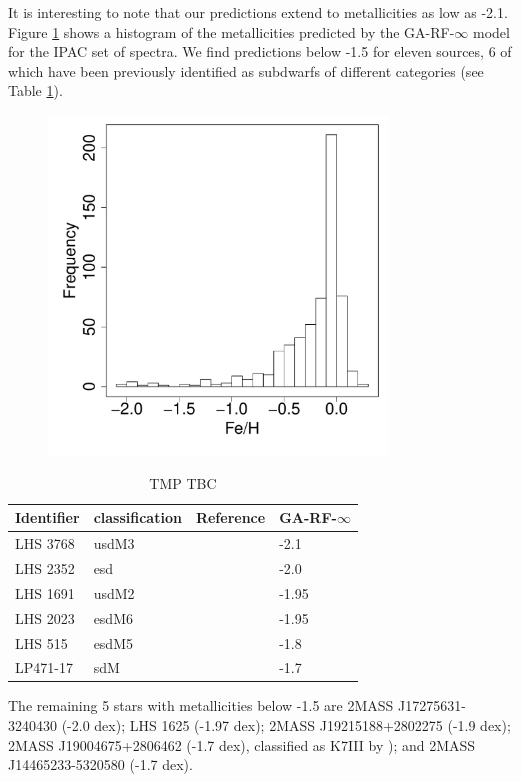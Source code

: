 It is interesting to note that our predictions extend to metallicities
as low as -2.1. Figure \ref{fig:ipac-hist-mets} shows a histogram of
the metallicities predicted by the GA-RF-$\infty$ model for the IPAC
set of spectra. We find predictions below -1.5 for eleven sources, 6
of which have been previously identified as subdwarfs of different
categories (see Table \ref{tab:known-sds}).

\begin{figure}
	\begin{center}
		\includegraphics[width=9cm]{figs/ipac-figs/ipac-M-hist.pdf}
		\caption{}
		\label{fig:ipac-hist-mets}
	\end{center}
\end{figure}


\begin{table}\centering
	\begin{tabular}{@{}llll@{}}
		\toprule
		Identifier & classification & Reference & GA-RF-$\infty$\\
		\hline
		LHS 3768 & usdM3 & \cite{1995AJ....109..797K}  & -2.1 \\
		LHS 2352 & esd   & \cite{1995AJ....109..797K}  & -2.0 \\
		LHS 1691 & usdM2 & \cite{0004-637X-669-2-1235} & -1.95\\
		LHS 2023 & esdM6 & \cite{0004-637X-672-2-1153} & -1.95\\
		LHS 515  & esdM5 & \cite{1538-3873-117-833-676}& -1.8\\
		LP471-17 & sdM   & \cite{1995AJ....109..797K}  & -1.7\\
		\bottomrule
	\end{tabular}
	\caption{TMP TBC} 
	\label{tab:known-sds} 
\end{table}

The remaining 5 stars with metallicities below -1.5 are 2MASS
J17275631-3240430 (-2.0 dex); LHS 1625 (-1.97 dex); 2MASS
J19215188+2802275 (-1.9 dex); 2MASS J19004675+2806462 (-1.7 dex),
classified as K7III by \cite{1994ApJS...94..749K}); and 2MASS
J14465233-5320580 (-1.7 dex).

